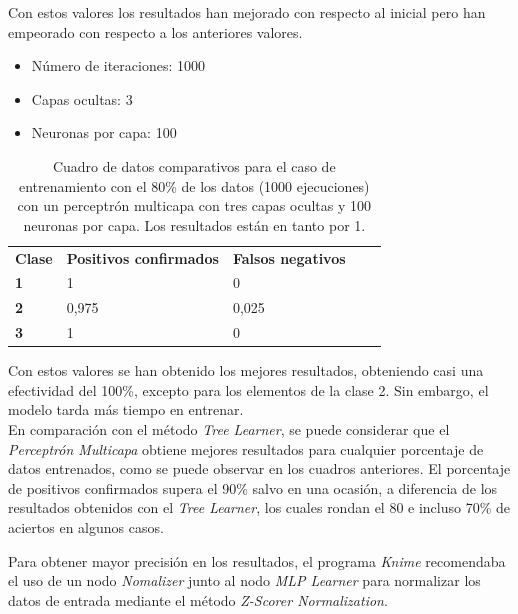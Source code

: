 \documentclass[10pt,a4paper]{article}
\begin{document}
Con estos valores los resultados han mejorado con respecto al inicial pero han empeorado con respecto a los anteriores valores.
\\

\begin{itemize}
	\item Número de iteraciones: 1000
	\item Capas ocultas: 3  
	\item Neuronas por capa: 100
	
\end{itemize}
\begin{table}[h!]
	\centering
	\begin{tabular}{|l|l|l|ll}
		\cline{1-3}
		\multicolumn{1}{|c|}{\textbf{Clase}} & \multicolumn{1}{c|}{\textbf{Positivos confirmados}} & \multicolumn{1}{c|}{\textbf{Falsos negativos}} & \multicolumn{1}{c}{\textbf{}} &  \\ \cline{1-3}
		\textbf{1}                       &        1                      &       0                         &                               &  \\ \cline{1-3}
		\textbf{2}                       &         0,975
		&       0,025 
		&                               &  \\ \cline{1-3}
		\textbf{3}                       &         1                       &      0 &                               &  \\ \cline{1-3}
	\end{tabular}
	\caption{Cuadro de datos comparativos para el caso de entrenamiento con el 80\%{} de los datos (1000 ejecuciones) con un perceptrón multicapa con tres capas ocultas y 100 neuronas por capa. Los resultados están en tanto por 1.}
	\label{tab:ej5_20porcent_3hidden_1000_100}
\end{table}

Con estos valores se han obtenido los mejores resultados, obteniendo casi una efectividad del 100\%, excepto para los elementos de la clase 2. Sin embargo, el modelo tarda más tiempo en entrenar.
\\

En comparación con el método \textit{Tree Learner}, se puede considerar que el \textit{Perceptrón Multicapa} obtiene mejores resultados para cualquier porcentaje de datos entrenados, como se puede observar en los cuadros anteriores. El porcentaje de positivos confirmados supera el 90\% salvo en una ocasión, a diferencia de los resultados obtenidos con el \textit{Tree Learner}, los cuales rondan el 80 e incluso 70\% de aciertos en algunos casos.\par
Para obtener mayor precisión en los resultados, el programa \textit{Knime} recomendaba el uso de un nodo \textit{Nomalizer} junto al nodo \textit{MLP Learner} para normalizar los datos de entrada mediante el método \textit{Z-Scorer Normalization}.
\end{document}
